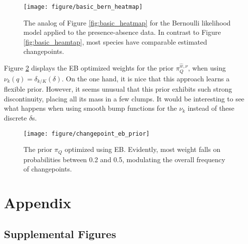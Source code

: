 \documentclass{article}
\begin{document}
\begin{figure}[ht]
  \centering
  \texttt{[image: figure/basic\_bern\_heatmap]}
  \caption{
    The analog of Figure \ref{fig:basic_heatmap} for the Bernoulli likelihood
    model applied to the presence-absence data. In contrast to Figure
    \ref{fig:basic_heamtap}, most species have comparable estimated
    changepoints.
    \label{fig:basic_bern_heatmap}
  }
\end{figure}

Figure \ref{fig:changepoint_eb_prior} displays the EB optimized weights for the
prior $\pi_{Q}^{\hat{w}, \nu}$, when using $\nu_{k}\left(q\right) = \delta_{k /
  K}\left(\delta\right)$. On the one hand, it is nice that this approach
learns a flexible prior. However, it seems unusual that this prior exhibits such
strong discontinuity, placing all its mass in a few clumps. It would be
interesting to see what happens when using smooth bump functions for the $\nu_k$
instead of these discrete $\delta$s.

\begin{figure}[ht]
  \centering
  \texttt{[image: figure/changepoint\_eb\_prior]}
  \caption{The prior $\pi_{Q}$ optimized using EB. Evidently, most weight falls
    on probabilities between 0.2 and 0.5, modulating the overall frequency of
    changepoints.
    \label{fig:changepoint_eb_prior} }
\end{figure}






\section{Appendix}
\label{sec:appendix}

\subsection{Supplemental Figures}
\label{subsec:supplemental_figures}

\begin{figure}[ht]
  \centering
  \caption{\label{fig:rpart_simple} }
\end{figure}
\end{document}
